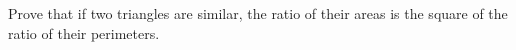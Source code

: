 Prove that if two triangles are similar, the ratio of their areas is the square of the ratio of their perimeters.
